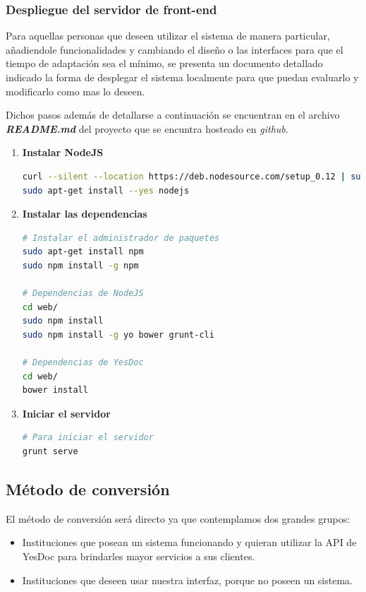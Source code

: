 \subsubsection{Despliegue del servidor de front-end}
Para aquellas personas que deseen utilizar el sistema de manera particular, añadiendole funcionalidades y cambiando el diseño o las interfaces para que el tiempo de adaptación sea el mínimo, se presenta un documento detallado indicado la forma de desplegar el sistema localmente para que puedan evaluarlo y modificarlo como mas lo deseen.

Dichos pasos además de detallarse a continuación se encuentran en el archivo \textit{\textbf{README.md}} del proyecto que se encuntra hosteado en \textit{github}.
\begin{enumerate}
\item \textbf{ Instalar NodeJS}

\begin{lstlisting}[language=bash]
curl --silent --location https://deb.nodesource.com/setup_0.12 | sudo bash -
sudo apt-get install --yes nodejs

\end{lstlisting}
\item \textbf{Instalar las dependencias}
\begin{lstlisting}[language=bash]
# Instalar el administrador de paquetes
sudo apt-get install npm
sudo npm install -g npm

# Dependencias de NodeJS
cd web/
sudo npm install
sudo npm install -g yo bower grunt-cli

# Dependencias de YesDoc
cd web/
bower install
\end{lstlisting}
\item \textbf{Iniciar el servidor}
\begin{lstlisting}[language=bash]
# Para iniciar el servidor
grunt serve
\end{lstlisting}


\end{enumerate}

\subsection{Método de conversión}
El método de conversión será directo ya que contemplamos dos grandes grupos:
\begin{itemize}
	\item Instituciones que posean un sistema funcionando y quieran utilizar la API de YesDoc para brindarles mayor servicios a sus clientes.
	\item Instituciones que deseen usar nuestra interfaz, porque no poseen un sistema.
\end{itemize}



